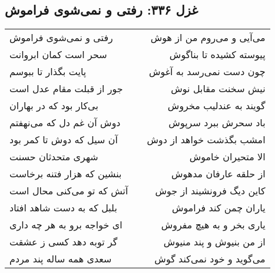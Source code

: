 \begin{center}
\section*{غزل ۳۳۶: رفتی و نمی‌شوی فراموش}
\label{sec:336}
\begin{longtable}{l p{0.5cm} r}
رفتی و نمی‌شوی فراموش
&&
می‌آیی و می‌روم من از هوش
\\
سحر است کمان ابروانت
&&
پیوسته کشیده تا بناگوش
\\
پایت بگذار تا ببوسم
&&
چون دست نمی‌رسد به آغوش
\\
جور از قبلت مقام عدل است
&&
نیش سخنت مقابل نوش
\\
بی‌کار بود که در بهاران
&&
گویند به عندلیب مخروش
\\
دوش آن غم دل که می‌نهفتم
&&
باد سحرش ببرد سرپوش
\\
آن سیل که دوش تا کمر بود
&&
امشب بگذشت خواهد از دوش
\\
شهری متحدثان حسنت
&&
الا متحیران خاموش
\\
بنشین که هزار فتنه برخاست
&&
از حلقه عارفان مدهوش
\\
آتش که تو می‌کنی محال است
&&
کاین دیگ فرونشیند از جوش
\\
بلبل که به دست شاهد افتاد
&&
یاران چمن کند فراموش
\\
ای خواجه برو به هر چه داری
&&
یاری بخر و به هیچ مفروش
\\
گر توبه دهد کسی ز عشقت
&&
از من بنیوش و پند منیوش
\\
سعدی همه ساله پند مردم
&&
می‌گوید و خود نمی‌کند گوش
\\
\end{longtable}
\end{center}
